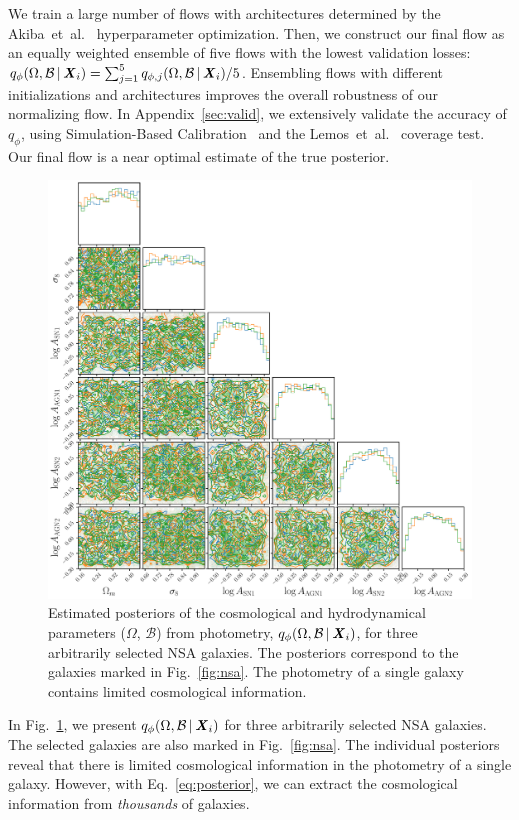 We train a large number of flows with architectures determined by the
Akiba~et~al.~ hyperparameter optimization.
Then, we construct our final flow as an equally weighted ensemble of five
flows with the lowest validation losses: 
$q_{\phi}(\Omega, \mathcal{B}\,|\, {\textbf{\textit{X}}_i}) = 
\sum_{j=1}^5 q_{\phi,j}(\Omega, \mathcal{B}\,|\, {\textbf{\textit{X}}_i})/5$. 
Ensembling flows with different initializations and architectures improves the
overall robustness of our normalizing flow.
In Appendix~\ref{sec:valid}, we extensively validate the accuracy of $q_\phi$,
using Simulation-Based Calibration~\citep{talts2020} and the
Lemos~et~al.~ coverage test. 
Our final flow is a near optimal estimate of the true posterior. 

\begin{figure}[ht]
\begin{center}
    \centerline{\includegraphics[width=\columnwidth]{figs/p_omega_x_i.pdf}}
    \vskip -0.1in
    \caption{Estimated posteriors of the cosmological and hydrodynamical 
    parameters ($\Omega$, $\mathcal{B}$) from photometry, 
    $q_{\phi}(\Omega, \mathcal{B}\,|\, {\textbf{\textit{X}}_i})$, for three arbitrarily 
    selected NSA galaxies. 
    The posteriors correspond to the galaxies marked in Fig.~\ref{fig:nsa}.
    The photometry of a single galaxy contains limited cosmological
    information. 
    }\label{fig:p_omega_x_i}
\end{center}
\vskip -0.2in
\end{figure}

In Fig.~\ref{fig:p_omega_x_i}, we present 
$q_{\phi}(\Omega, \mathcal{B}\,|\, {\textbf{\textit{X}}_i})$
for three arbitrarily selected NSA galaxies. 
The selected galaxies are also marked in Fig.~\ref{fig:nsa}. 
The individual posteriors reveal that  there is limited cosmological
information in the photometry of a single galaxy. 
However, with Eq.~\ref{eq:posterior}, we can extract the cosmological
information from {\em thousands} of galaxies.
